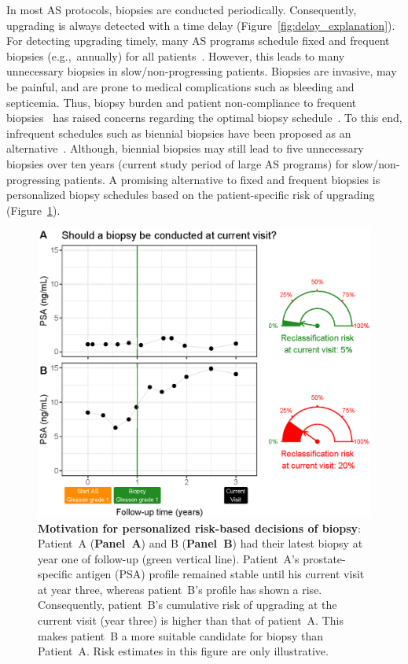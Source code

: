 In most AS protocols, biopsies are conducted periodically. Consequently, upgrading is always detected with a time delay (Figure~\ref{fig:delay_explanation}). For detecting upgrading timely, many AS programs schedule fixed and frequent biopsies (e.g.,~annually) for all patients~\citep{nieboer2018active,loeb2014heterogeneity}. However, this leads to many unnecessary biopsies in slow/non-progressing patients. Biopsies are invasive, may be painful, and are prone to medical complications such as bleeding and septicemia\citep{loeb2013systematic}. Thus, biopsy burden and patient non-compliance to frequent biopsies~\citep{bokhorst2015compliance} has raised concerns regarding the optimal biopsy schedule~\citep{inoue2018comparative, bratt2013study}. To this end, infrequent schedules such as biennial biopsies have been proposed as an alternative~\citep{inoue2018comparative,de2017estimating}. Although, biennial biopsies may still lead to five unnecessary biopsies over ten years (current study period of large AS programs) for slow/non-progressing patients. A promising alternative to fixed and frequent biopsies is personalized biopsy schedules based on the patient-specific risk of upgrading (Figure~\ref{fig:riskBasedExample}).

\begin{figure}
\centerline{\includegraphics[width=\columnwidth]{images/riskBasedExample.eps}}
\caption{\textbf{Motivation for personalized risk-based decisions of biopsy}: Patient~A (\textbf{Panel~A}) and B (\textbf{Panel~B}) had their latest biopsy at year one of follow-up (green vertical line). Patient~A's prostate-specific antigen (PSA) profile remained stable until his current visit at year three, whereas patient~B's profile has shown a rise. Consequently, patient~B's cumulative risk of upgrading at the current visit (year three) is higher than that of patient~A. This makes patient~B a more suitable candidate for biopsy than Patient~A. Risk estimates in this figure are only illustrative.}
\label{fig:riskBasedExample}
\end{figure}

